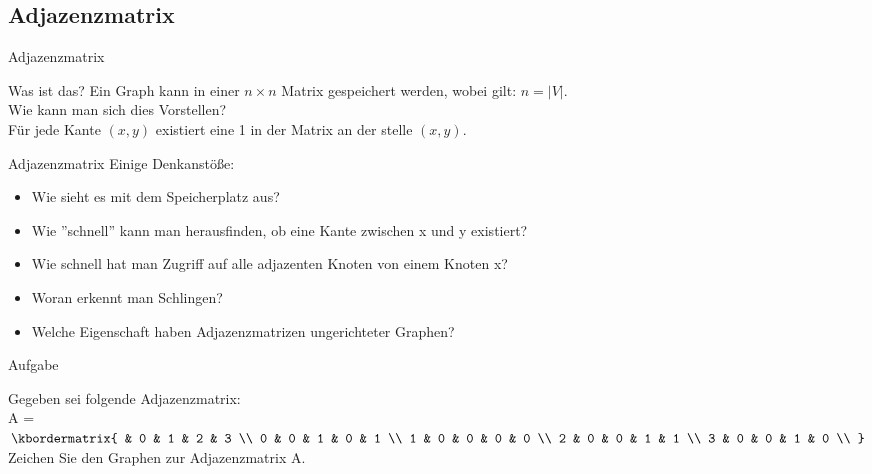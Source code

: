 	
	\subsection{Adjazenzmatrix}
	\begin{frame}{Adjazenzmatrix}
		\begin{block}{Was ist das?}
			Ein Graph kann in einer $n \times n$ Matrix gespeichert werden, 
			wobei gilt: $n = |V|$.\\
			\vspace{10pt}
			\pause
			Wie kann man sich dies Vorstellen?\\
			\pause
			Für jede Kante $(x,y)$ existiert eine 1 in der Matrix an der stelle $(x,y)$.
		\end{block}
		
	\end{frame}
	
	
	\begin{frame}{Adjazenzmatrix}
		Einige Denkanstöße:
		\begin{itemize}
			\pause
			\item Wie sieht es mit dem Speicherplatz aus?
			
			\pause
			\item Wie ''schnell'' kann man herausfinden, ob eine Kante zwischen x und y existiert?
			
			\pause
			\item Wie schnell hat man Zugriff auf alle adjazenten Knoten von einem Knoten x?
			
			\pause
			\item Woran erkennt man Schlingen?
			
			\pause
			\item Welche Eigenschaft haben Adjazenzmatrizen ungerichteter Graphen?
		\end{itemize}
	\end{frame}
	
	
	\begin{frame}{Aufgabe}
		\begin{block}{}
			Gegeben sei folgende Adjazenzmatrix:\\
			A = $\kbordermatrix{
          		  & 0 & 1 & 2 & 3 \\
        		0 & 0 & 1 & 0 & 1 \\
        		1 & 0 & 0 & 0 & 0 \\
        		2 & 0 & 0 & 1 & 1 \\
        		3 & 0 & 0 & 1 & 0 \\
      			}$\\
      		\vspace{10pt}
      		Zeichen Sie den Graphen zur Adjazenzmatrix A.
		\end{block}
		
	\end{frame}
	
